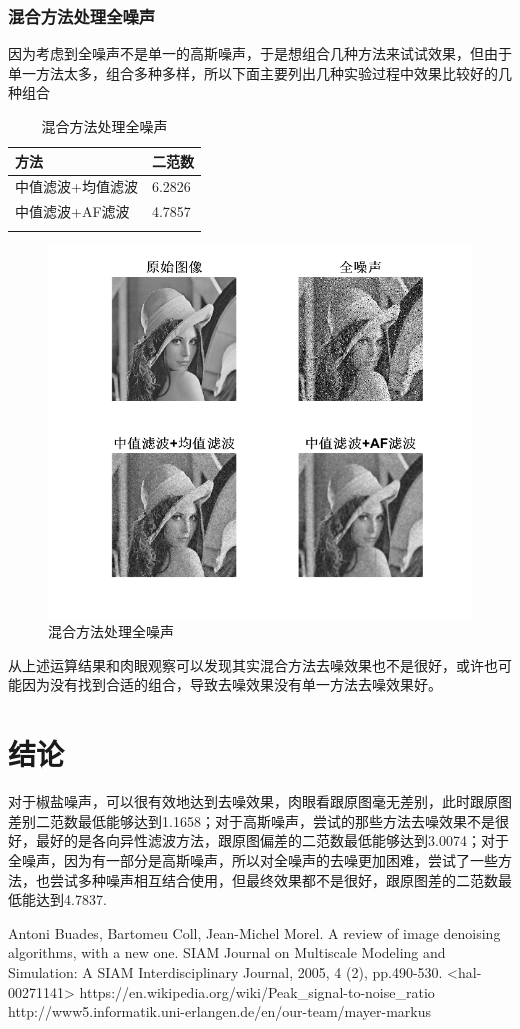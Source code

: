 \documentclass[a4paper,left=2.5cm,right=2.5cm]{article}
\begin{document}
\begin{spacing}{1.6}
		\subsubsection{混合方法处理全噪声}
		因为考虑到全噪声不是单一的高斯噪声，于是想组合几种方法来试试效果，但由于单一方法太多，组合多种多样，所以下面主要列出几种实验过程中效果比较好的几种组合
		\begin{longtable}{ll}
			\hline
			方法&二范数\\
			\hline
			中值滤波+均值滤波&6.2826\\
			中值滤波+AF滤波& 4.7857\\
			\hline
			\caption{混合方法处理全噪声}
		\end{longtable}
		\begin{figure}[H]
			\includegraphics[width=\textwidth]{image/result_test_all3.png}
			\caption{混合方法处理全噪声}
		\end{figure}
		
		从上述运算结果和肉眼观察可以发现其实混合方法去噪效果也不是很好，或许也可能因为没有找到合适的组合，导致去噪效果没有单一方法去噪效果好。
		\section{结论}
		对于椒盐噪声，可以很有效地达到去噪效果，肉眼看跟原图毫无差别，此时跟原图差别二范数最低能够达到1.1658；对于高斯噪声，尝试的那些方法去噪效果不是很好，最好的是各向异性滤波方法，跟原图偏差的二范数最低能够达到3.0074；对于全噪声，因为有一部分是高斯噪声，所以对全噪声的去噪更加困难，尝试了一些方法，也尝试多种噪声相互结合使用，但最终效果都不是很好，跟原图差的二范数最低能达到4.7837.
	\begin{thebibliography}{99}
		Antoni Buades, Bartomeu Coll, Jean-Michel Morel. A review of image denoising algorithms,
		with a new one. SIAM Journal on Multiscale Modeling and Simulation: A SIAM Interdisciplinary Journal, 2005, 4 (2), pp.490-530. <hal-00271141>
		https://en.wikipedia.org/wiki/Peak\_signal-to-noise\_ratio
		http://www5.informatik.uni-erlangen.de/en/our-team/mayer-markus
	\end{thebibliography}
\end{spacing}
\end{document}
